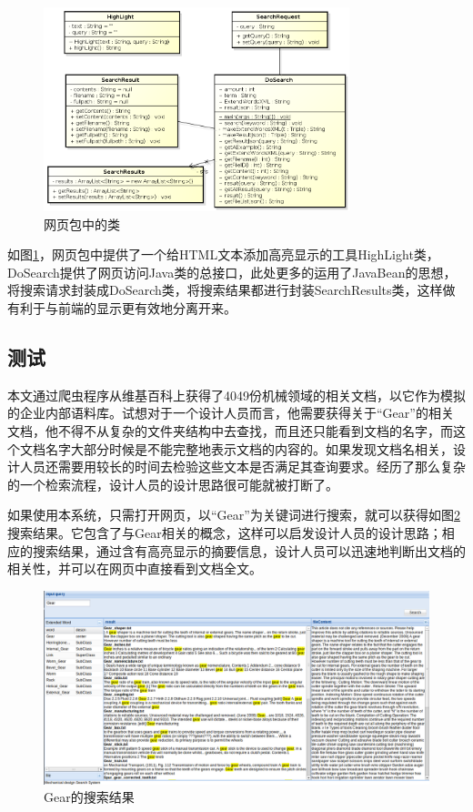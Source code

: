 \documentclass[12pt,a4paper]{article}
\begin{document}
\begin{enumerate}
	\begin{figure}[htbp] 
	\centering\includegraphics[width=3.5in]{fig/webpackage.png} 
	\caption{网页包中的类}\label{fig:web包}
	\end{figure}
	如图\ref{fig:web包}，网页包中提供了一个给HTML文本添加高亮显示的工具HighLight类，DoSearch提供了网页访问Java类的总接口，此处更多的运用了JavaBean的思想，将搜索请求封装成DoSearch类，将搜索结果都进行封装SearchResults类，这样做有利于与前端的显示更有效地分离开来。
	\end{enumerate}

	
	\subsection{测试}
	本文通过爬虫程序从维基百科上获得了4049份机械领域的相关文档，以它作为模拟的企业内部语料库。试想对于一个设计人员而言，他需要获得关于“Gear”的相关文档，他不得不从复杂的文件夹结构中去查找，而且还只能看到文档的名字，而这个文档名字大部分时候是不能完整地表示文档的内容的。如果发现文档名相关，设计人员还需要用较长的时间去检验这些文本是否满足其查询要求。经历了那么复杂的一个检索流程，设计人员的设计思路很可能就被打断了。

	如果使用本系统，只需打开网页，以“Gear”为关键词进行搜索，就可以获得如图\ref{fig:Gear的搜索结果}搜索结果。它包含了与Gear相关的概念，这样可以启发设计人员的设计思路；相应的搜索结果，通过含有高亮显示的摘要信息，设计人员可以迅速地判断出文档的相关性，并可以在网页中直接看到文档全文。

	
	\begin{figure}[htbp]
	\centering
	\includegraphics[width=6in]{fig/SearchResult.png}
	\caption{Gear的搜索结果}
	\label{fig:Gear的搜索结果}
	\end{figure}
	
\end{document}
